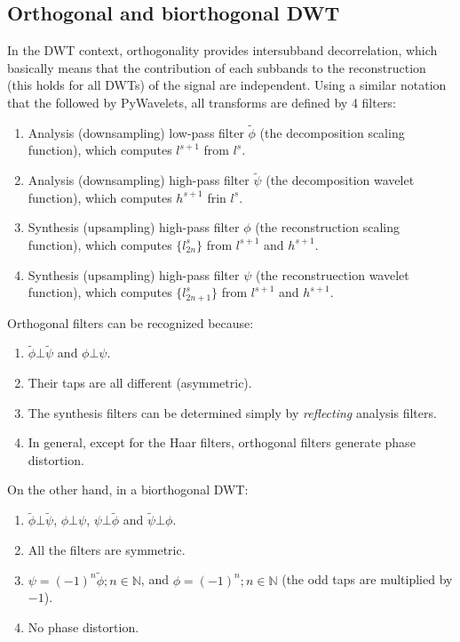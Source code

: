 \subsection{Orthogonal and biorthogonal DWT}
In the DWT context, orthogonality provides intersubband decorrelation,
which basically means that the contribution of each subbands to the
reconstruction (this holds for all DWTs) of the signal are
independent. Using a similar notation that the followed by PyWavelets,
all transforms are defined by 4 filters:
\begin{enumerate}
\item Analysis (downsampling) low-pass filter $\tilde\phi$ (the decomposition
  scaling function), which computes $l^{s+1}$ from $l^s$.
\item Analysis (downsampling) high-pass filter $\tilde\psi$ (the decomposition
  wavelet function), which computes $h^{s+1}$ frin $l^s$.
\item Synthesis (upsampling) high-pass filter $\phi$ (the
  reconstruction scaling function), which computes $\{l^s_{2n}\}$ from
  $l^{s+1}$ and $h^{s+1}$.
\item Synthesis (upsampling) high-pass filter $\psi$ (the
  reconstruection wavelet function), which computes $\{l^s_{2n+1}\}$
  from $l^{s+1}$ and $h^{s+1}$.
\end{enumerate}

Orthogonal filters can be recognized because:
\begin{enumerate}
\item $\tilde\phi\bot\tilde\psi$ and $\phi\bot\psi$.
\item Their taps are all different (asymmetric).
\item The synthesis filters can be determined simply by
  \emph{reflecting} analysis filters.
\item In general, except for the Haar filters, orthogonal filters
  generate phase distortion.
\end{enumerate}

On the other hand, in a biorthogonal DWT:
\begin{enumerate}
\item $\tilde\phi\bot\tilde\psi$, $\phi\bot\psi$, $\psi\bot\tilde\phi$
  and $\tilde\psi\bot\phi$.
\item All the filters are symmetric.
\item $\psi=(-1)^n\tilde\phi; n\in\mathbb{N}$, and
  $\phi=(-1)^n; n\in\mathbb{N}$ (the odd taps are multiplied by $-1$).
\item No phase distortion.
\end{enumerate}

